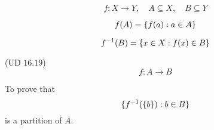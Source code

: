 \begin{frame}{}
  \[
    f: X \to Y, \quad A \subseteq X, \quad B \subseteq Y
  \]

  \[
    f(A) = \{f(a): a \in A\}
  \]

  \[
    f^{-1}(B) = \{x \in X: f(x) \in B\}
  \]
\end{frame}

\begin{frame}{}
  \begin{exampleblock}{(UD $16.19$)}
    \[
      f: A \to B
    \]

    \centerline{}

    To prove that
    \[
      \{f^{-1}(\{b\}): b \in B\}
    \]
    is a partition of $A$.
  \end{exampleblock}
\end{frame}
